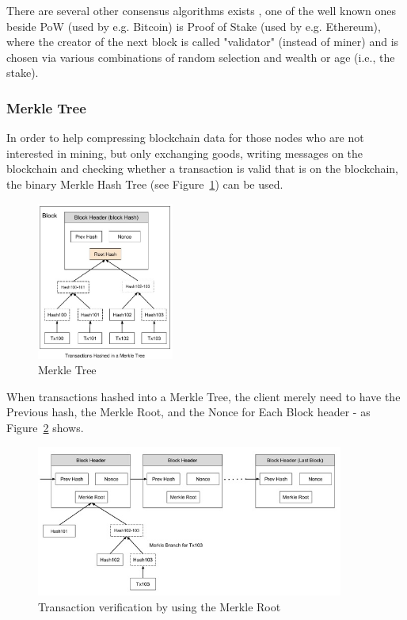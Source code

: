 \documentclass[a4paper]{article}
\begin{document}
There are several other consensus algorithms exists \cite{consensus}, one of the well known ones beside PoW (used by e.g. Bitcoin) is Proof of Stake (used by e.g. Ethereum), where the creator of the next block is called "validator" (instead of miner) and is chosen via various combinations of random selection and wealth or age (i.e., the stake).  

\subsubsection{Merkle Tree}

In order to help compressing blockchain data for those nodes who are not interested in mining, but only exchanging goods, writing messages on the blockchain and checking whether a transaction is valid that is on the blockchain, the binary Merkle Hash Tree (see Figure~\ref{fig:merkle}) can be used.

\begin{figure}[H]
    \centering
    \includegraphics[width=0.4\textwidth]{figures/merkle_tree.jpg}
    \caption{Merkle Tree \cite{tutorialspoint}}
    \label{fig:merkle}
\end{figure}

When transactions hashed into a Merkle Tree, the client merely need to have the Previous hash, the Merkle Root, and the Nonce for Each Block header - as Figure~\ref{fig:merkle_verif} shows. 

\begin{figure}[H]
    \centering
    \includegraphics[width=0.9\textwidth]{figures/payment_verification.jpg}
    \caption{Transaction verification by using the Merkle Root \cite{tutorialspoint}}
    \label{fig:merkle_verif}
\end{figure}
\end{document}
